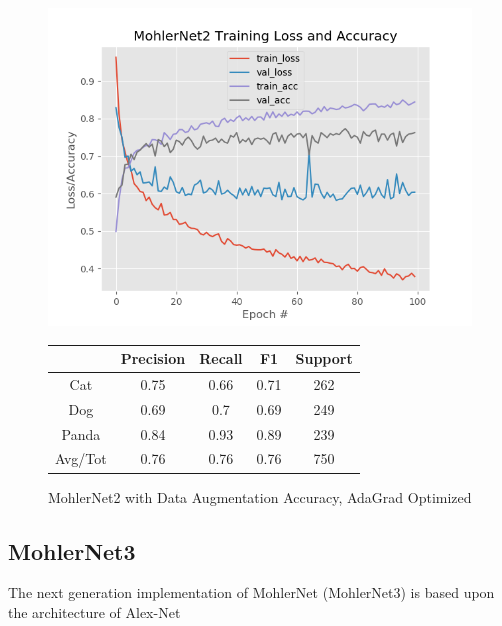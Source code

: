 \documentclass[12pt]{article}
\begin{document}
\begin{figure}[h]
	\centering %
	\captionsetup{justification=centering}
	\begin{minipage}{0.5\textwidth}
		\centering %
		\includegraphics[width=1\textwidth]{MohlerNet2_opt-AdaGradAugment_KEEP.png}
		\caption{MohlerNet2 with Data Augmentation Accuracy, AdaGrad Optimized} \label{MN2Aug}
	\end{minipage}\hfill
	\begin{minipage}{0.5\textwidth}
		\begin{center}
			\begin{tabular}[5pt]{| c| c| c| c|c|}
				\hline
				& Precision & Recall & F1 & Support \\[0.5ex] 
				\hline 	
				Cat   &    0.75&	0.66&	0.71&	262\\ \hline 
				Dog    &   0.69&	0.7&	0.69&	249\\ \hline 
				Panda   &   0.84&	0.93&	0.89&	239\\ \hline 
				Avg/Tot  &    0.76&	0.76&	0.76&	750\\ \hline 
				
			\end{tabular}
			\label{MN2RAug}
		\end{center}	
	\end{minipage}
\end{figure}

\subsection{MohlerNet3}
The next generation implementation of MohlerNet (MohlerNet3) is based upon the architecture of Alex-Net \cite{NIPS2012_4824}
\end{document}
